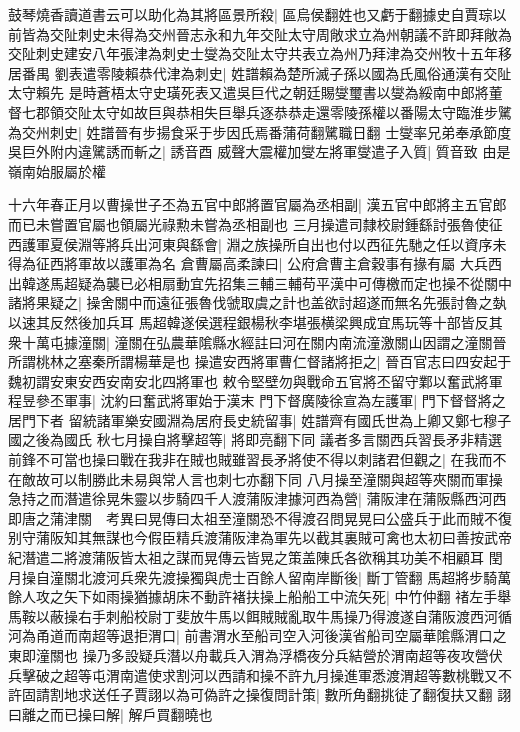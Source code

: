 鼓琴燒香讀道書云可以助化為其將區景所殺|{
	區烏侯翻姓也又虧于翻據史自賈琮以前皆為交阯刺史未得為交州晉志永和九年交阯太守周敞求立為州朝議不許即拜敞為交阯刺史建安八年張津為刺史士燮為交阯太守共表立為州乃拜津為交州牧十五年移居番禺}
劉表遣零陵賴恭代津為刺史|{
	姓譜賴為楚所滅子孫以國為氏風俗通漢有交阯太守賴先}
是時蒼梧太守史璜死表又遣吳巨代之朝廷賜燮璽書以燮為綏南中郎將董督七郡領交阯太守如故巨與恭相失巨舉兵逐恭恭走還零陵孫權以番陽太守臨淮步騭為交州刺史|{
	姓譜晉有步揚食采于步因氏焉番蒲荷翻騭職日翻}
士燮率兄弟奉承節度吳巨外附内違騭誘而斬之|{
	誘音酉}
威聲大震權加燮左將軍燮遣子入質|{
	質音致}
由是嶺南始服屬於權

十六年春正月以曹操世子丕為五官中郎將置官屬為丞相副|{
	漢五官中郎將主五官郎而已未嘗置官屬也領屬光祿勲未嘗為丞相副也}
三月操遣司隸校尉鍾繇討張魯使征西護軍夏侯淵等將兵出河東與繇會|{
	淵之族操所自出也付以西征先馳之任以資序未得為征西將軍故以護軍為名}
倉曹屬高柔諫曰|{
	公府倉曹主倉穀事有掾有屬}
大兵西出韓遂馬超疑為襲已必相扇動宜先招集三輔三輔苟平漢中可傳檄而定也操不從關中諸將果疑之|{
	操舍關中而遠征張魯伐虢取虞之計也盖欲討超遂而無名先張討魯之埶以速其反然後加兵耳}
馬超韓遂侯選程銀楊秋李堪張横梁興成宜馬玩等十部皆反其衆十萬屯據潼關|{
	潼關在弘農華隂縣水經註曰河在關内南流潼激關山因謂之潼關晉所謂桃林之塞秦所謂楊華是也}
操遣安西將軍曹仁督諸將拒之|{
	晉百官志曰四安起于魏初謂安東安西安南安北四將軍也}
敕令堅壁勿與戰命五官將丕留守鄴以奮武將軍程昱參丕軍事|{
	沈約曰奮武將軍始于漢末}
門下督廣陵徐宣為左護軍|{
	門下督督將之居門下者}
留統諸軍樂安國淵為居府長史統留事|{
	姓譜齊有國氏世為上卿又鄭七穆子國之後為國氏}
秋七月操自將擊超等|{
	將即亮翻下同}
議者多言關西兵習長矛非精選前鋒不可當也操曰戰在我非在賊也賊雖習長矛將使不得以刺諸君但觀之|{
	在我而不在敵故可以制勝此未易與常人言也刺七亦翻下同}
八月操至潼關與超等夾關而軍操急持之而潛遣徐晃朱靈以步騎四千人渡蒲阪津據河西為營|{
	蒲阪津在蒲阪縣西河西即唐之蒲津關　考異曰晃傳曰太祖至潼關恐不得渡召問晃晃曰公盛兵于此而賊不復别守蒲阪知其無謀也今假臣精兵渡蒲阪津為軍先以截其裏賊可禽也太初曰善按武帝紀潛遣二將渡蒲阪皆太祖之謀而晃傳云皆晃之策盖陳氏各欲稱其功美不相顧耳}
閏月操自潼關北渡河兵衆先渡操獨與虎士百餘人留南岸斷後|{
	斷丁管翻}
馬超將步騎萬餘人攻之矢下如雨操猶據胡床不動許褚扶操上船船工中流矢死|{
	中竹仲翻}
禇左手舉馬鞍以蔽操右手刺船校尉丁斐放牛馬以餌賊賊亂取牛馬操乃得渡遂自蒲阪渡西河循河為甬道而南超等退拒渭口|{
	前書渭水至船司空入河後漢省船司空屬華隂縣渭口之東即潼關也}
操乃多設疑兵潛以舟載兵入渭為浮橋夜分兵結營於渭南超等夜攻營伏兵擊破之超等屯渭南遣使求割河以西請和操不許九月操進軍悉渡渭超等數桃戰又不許固請割地求送任子賈詡以為可偽許之操復問計策|{
	數所角翻挑徒了翻復扶又翻}
詡曰離之而已操曰解|{
	解戶買翻曉也}
